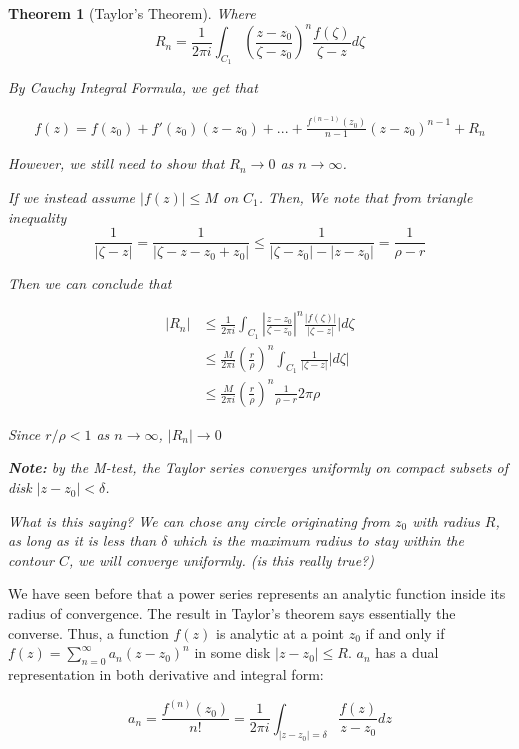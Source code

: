 \documentclass{article}
\newtheorem{theorem}{Theorem}[section]
\theoremstyle{definition}
\begin{document}
\begin{theorem}[Taylor's Theorem]
Where 
$$R_n = \frac{1}{2 \pi i } \int_{C_1} \left(\frac{z-z_0}{\zeta - z_0}\right)^n \frac{f(\zeta)}{\zeta - z}d\zeta$$

By Cauchy Integral Formula, we get that 

\begin{align*}
f(z) = f(z_0) + f'(z_0)(z-z_0) + ... + \frac{f^{(n-1)}(z_0)}{n-1}(z-z_0)^{n-1} + R_n
\end{align*}

However, we still need to show that $R_n \to 0$ as $n \to \infty$. 

If we instead assume $|f(z)| \leq M $ on $C_1$. Then,
We note that from triangle inequality $$\frac{1}{|\zeta-z|} = \frac{1}{|\zeta - z - z_0 + z_0|} \leq \frac{1}{|\zeta - z_0| - |z-z_0|} = \frac{1}{\rho - r}$$

Then we can conclude that

\begin{align*}
|R_n| &\leq \frac{1}{2 \pi i } \int_{C_1} \left|\frac{z-z_0}{\zeta - z_0}\right|^n \frac{|f(\zeta)|}{|\zeta - z|}|d\zeta \\ 
&\leq \frac{M}{2 \pi i } \left(\frac{r}{\rho}\right)^n \int_{C_1} \frac{1}{|\zeta-z|}|d\zeta| \\
&\leq \frac{M}{2 \pi i } \left(\frac{r}{\rho}\right)^n \frac{1}{\rho - r} 2 \pi \rho 
\end{align*}

Since $r/\rho < 1$ as $n \to \infty$, $|R_n| \to 0$

\textbf{Note:} by the M-test, the Taylor series converges uniformly on  compact subsets of disk $|z-z_0|<\delta$. 


What is this saying? We can chose any circle originating from $z_0$ with radius $R$, as long as it is less than $\delta$ which is the maximum radius to stay within the contour $C$, we will converge uniformly. (is this really true?)
\end{theorem}

We have seen before that a power series represents an analytic function inside its radius of convergence. The result in Taylor's theorem says essentially the converse. Thus, a function $f(z)$ is analytic at a point $z_0$ if and only if $f(z) = \sum_{n=0}^{\infty}a_n(z-z_0)^n$ in some disk $|z-z_0| \leq R$. $a_n$ has a dual representation in both derivative and integral form:

$$a_n  = \frac{f^(n)(z_0)}{n!} = \frac{1}{2 \pi i } \int_{|z-z_0|=\delta} \frac{f(z)}{z - z_0} dz$$
\end{document}
